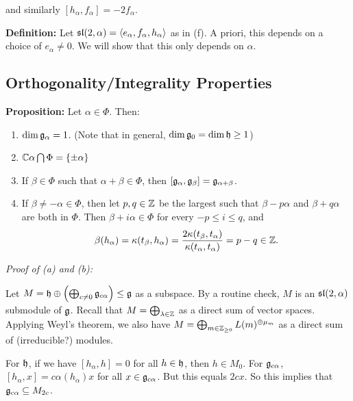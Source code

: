 and similarly \([h_\alpha, f_\alpha] = -2 f_\alpha\).

\textbf{Definition:} Let
\({\mathfrak{sl}}(2, \alpha) = \left\langle{e_\alpha, f_\alpha, h_\alpha}\right\rangle\) as in
(f). A priori, this depends on a choice of \(e_\alpha \neq 0\). We will
show that this only depends on \(\alpha\).

\hypertarget{orthogonalityintegrality-properties}{%
\subsection{Orthogonality/Integrality
Properties}\label{orthogonalityintegrality-properties}}

\textbf{Proposition:} Let \(\alpha \in \Phi\). Then:

\begin{enumerate}
\def\labelenumi{\alph{enumi}.}
\tightlist
\item
  \(\dim {\mathfrak{g}}_\alpha = 1\). (Note that in general,
  \(\dim {\mathfrak{g}}_0 = \dim {\mathfrak{h}} \geq 1\))
\item
  \({\mathbb{C}}\alpha \bigcap \Phi = \left\{{\pm \alpha}\right\}\)
\item
  If \(\beta \in \Phi\) such that \(\alpha + \beta \in \Phi\), then
  \([{\mathfrak{g}}_\alpha, {\mathfrak{g}}_\beta] = {\mathfrak{g}}_{\alpha + \beta}\).
\item
  If \(\beta \neq -\alpha \in \Phi\), then let \(p,q \in {\mathbb{Z}}\) be the
  largest such that \(\beta - p\alpha\) and \(\beta + q\alpha\) are both
  in \(\Phi\). Then \(\beta + i\alpha \in \Phi\) for every
  \(-p \leq i \leq q\), and \begin{align*}
  \beta(h_\alpha) = \kappa(t_\beta, h_\alpha) = \frac{2\kappa(t_\beta, t_\alpha)}{\kappa(t_\alpha, t_\alpha)} = p-q \in {\mathbb{Z}}
  .\end{align*}
\end{enumerate}

\emph{Proof of (a) and (b):}

Let
\(M = {\mathfrak{h}} \oplus \left( \bigoplus_{c\neq 0} {\mathfrak{g}}_{c\alpha} \right) \leq {\mathfrak{g}}\)
as a subspace. By a routine check, \(M\) is an \({\mathfrak{sl}}(2, \alpha)\)
submodule of \({\mathfrak{g}}\). Recall that \(M = \bigoplus_{\lambda \in {\mathbb{Z}}}\)
as a direct sum of vector spaces. Applying Weyl's theorem, we also have
\(M = \bigoplus_{m \in {\mathbb{Z}}_{\geq 0}} L(m)^{\oplus \mu_m}\) as a direct
sum of (irreducible?) modules.

For \({\mathfrak{h}}\), if we have \([h_\alpha, h] = 0\) for all \(h\in {\mathfrak{h}}\),
then \(h \in M_0\). For \({\mathfrak{g}}_{c\alpha}\),
\([h_\alpha, x] = c\alpha(h_\alpha) x\) for all
\(x\in {\mathfrak{g}}_{c\alpha}\). But this equals \(2cx\). So this implies that
\({\mathfrak{g}}_{c\alpha} \subseteq M_{2c}\).

